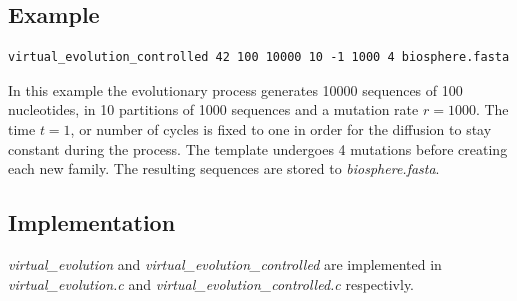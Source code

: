 \subsection{Example}
\begin{lstlisting}
virtual_evolution_controlled 42 100 10000 10 -1 1000 4 biosphere.fasta
\end{lstlisting}
In this example the evolutionary process generates 10000 sequences of 100
nucleotides, in 10 partitions of 1000 sequences and a mutation rate
$r=1000$. The time $t=1$, or number of cycles is fixed to one in order
for the diffusion to stay constant during the process. The template
undergoes 4 mutations before creating each new family. The resulting
sequences are stored to \emph{biosphere.fasta}.

\subsection{Implementation}
\emph{virtual\_evolution} and \emph{virtual\_evolution\_controlled}
are implemented in \emph{virtual\_evolution.c} and
\emph{virtual\_evolution\_controlled.c} respectivly. 




